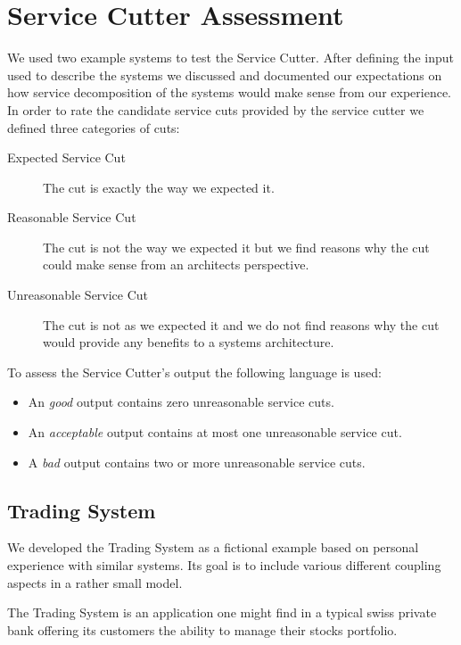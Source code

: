 \chapter{Service Cutter Assessment}
\label{testSystems}

We used two example systems to test the Service Cutter. After defining the input used to describe the systems we discussed and documented our expectations on how service decomposition of the systems would make sense from our experience. In order to rate the candidate service cuts provided by the service cutter we defined three categories of cuts:

\begin{description}
	\item[Expected Service Cut] The cut is exactly the way we expected it. 
	\item[Reasonable Service Cut] The cut is not the way we expected it but we find reasons why the cut could make sense from an architects perspective.
	\item[Unreasonable Service Cut] The cut is not as we expected it and we do not find reasons why the cut would provide any benefits to a systems architecture. 
\end{description}

To assess the Service Cutter's output the following language is used:

\begin{itemize}
	\item An \textit{good} output contains zero unreasonable service cuts.
	\item An \textit{acceptable} output contains at most one unreasonable service cut.
	\item A \textit{bad} output contains two or more unreasonable service cuts.
\end{itemize}


\section{Trading System}
\label{sec:tradingSystem}

We developed the Trading System as a fictional example based on personal experience with similar systems. Its goal is to include various different coupling aspects in a rather small model.

The Trading System is an application one might find in a typical swiss private bank offering its customers the ability to manage their stocks portfolio.

